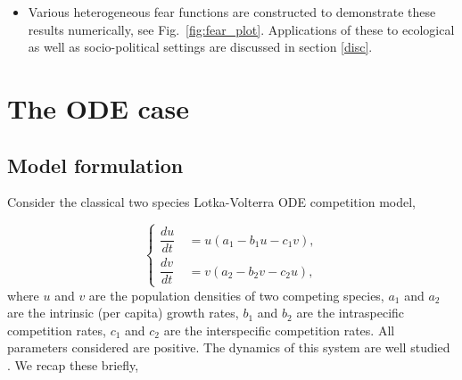 \documentclass[10pt]{amsart}
\theoremstyle{definition}
\begin{document}
\begin{itemize}
 \item Various heterogeneous fear functions are constructed to demonstrate these results numerically, see Fig.~\ref{fig:fear_plot}. Applications of these to ecological as well as socio-political settings are discussed in section \ref{disc}.
 
 
 
 \end{itemize}


\section{The ODE case}
\subsection{Model formulation}

Consider the classical two species Lotka-Volterra ODE competition model,

\begin{equation}\label{eq:GeneralEquation}
\left\{ \begin{array}{ll}
\dfrac{du }{dt} &~ = u (a_{1}-b_{1}u - c_{1}v) ,\\[2ex]
\dfrac{dv }{dt} &~ =  v (a_{2}-b_{2}v - c_{2}u),
\end{array}\right.
\end{equation}
%
%
where $u$ and $v$ are the population densities of two competing species, $a_1$ and $a_2$ are the intrinsic (per capita) growth rates, $b_1$ and $b_2$ are the intraspecific competition rates, $c_1$ and $c_2$ are the interspecific competition rates. All parameters considered are positive. The dynamics of this system are well studied \cite{Murray93}. We recap these briefly,
\end{document}
